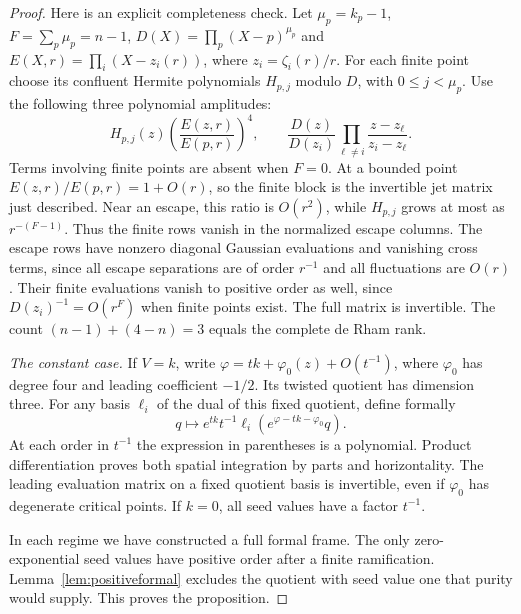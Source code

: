 \begin{proof}
Here is an explicit completeness check. Let $\mu_p=k_p-1$,
$F=\sum_p\mu_p=n-1$, $D(X)=\prod_p(X-p)^{\mu_p}$ and
$E(X,r)=\prod_i(X-z_i(r))$, where $z_i=\zeta_i(r)/r$.
For each finite point choose its confluent Hermite polynomials
$H_{p,j}$ modulo $D$, with $0\leq j<\mu_p$. Use the following
three polynomial amplitudes:
\[
 H_{p,j}(z)\left(\frac{E(z,r)}{E(p,r)}\right)^4,
 \qquad
 \frac{D(z)}{D(z_i)}\prod_{\ell\ne i}
              \frac{z-z_\ell}{z_i-z_\ell}.
\]
Terms involving finite points are absent when $F=0$.
At a bounded point $E(z,r)/E(p,r)=1+O(r)$, so the finite block is
the invertible jet matrix just described. Near an escape, this ratio
is $O(r^2)$, while $H_{p,j}$ grows at most as $r^{-(F-1)}$.
Thus the finite rows vanish in the normalized escape columns.
The escape rows have nonzero diagonal Gaussian evaluations and
vanishing cross terms, since all escape separations are of order
$r^{-1}$ and all fluctuations are $O(r)$. Their finite evaluations
vanish to positive order as well, since $D(z_i)^{-1}=O(r^F)$
when finite points exist. The full matrix is invertible. The count
$(n-1)+(4-n)=3$ equals the complete de Rham rank.

\emph{The constant case.}
If $V=k$, write $\varphi=tk+\varphi_0(z)+O(t^{-1})$, where
$\varphi_0$ has degree four and leading coefficient $-1/2$.
Its twisted quotient has dimension three. For any basis $\ell_i$
of the dual of this fixed quotient, define formally
\[
 q\longmapsto e^{tk}t^{-1}
     \ell_i\!\left(e^{\varphi-tk-\varphi_0}q\right).
\]
At each order in $t^{-1}$ the expression in parentheses is a
polynomial. Product differentiation proves both spatial integration
by parts and horizontality. The leading evaluation matrix on a fixed
quotient basis is invertible, even if $\varphi_0$ has degenerate critical
points. If $k=0$, all seed values have a factor $t^{-1}$.

In each regime we have constructed a full formal frame. The only
zero-exponential seed values have positive order after a finite
ramification. Lemma~\ref{lem:positiveformal} excludes the quotient
with seed value one that purity would supply. This proves the proposition.
\end{proof}
